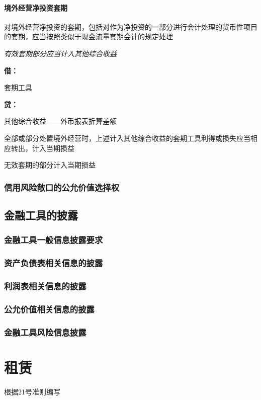 \documentclass[UTF8,12pt]{ctexart}
\newenvironment{Dr}{%
	\begin{list}{}%
		{
			\setlength{\leftmargin}{2em}
			\setlength{\labelwidth}{2em}
			\setlength{\labelsep}{0pt}
			\setlength{\itemindent}{0pt}
			\setlength{\listparindent}{0pt}
			\setlength{\parsep}{0pt}
			\setlength{\topsep}{0pt}
		}
		\item[\textbf{借：}]
	}{%
	\end{list}
}
\newenvironment{Cr}{%
	\begin{list}{}%
		{
			\setlength{\leftmargin}{2em}
			\setlength{\labelwidth}{2em}
			\setlength{\labelsep}{0pt}
			\setlength{\itemindent}{0pt}
			\setlength{\listparindent}{0pt}
			\setlength{\parsep}{0pt}
			\setlength{\topsep}{0pt}
		}
		\item[\textbf{贷：}]
	}{%
	\end{list}
}
\numberwithin{equation}{section} %
\numberwithin{figure}{section}
\numberwithin{table}{section}
\begin{document}
	\paragraph{境外经营净投资套期}
	对境外经营净投资的套期，包括对作为净投资的一部分进行会计处理的货币性项目的套期，应当按照类似于现金流量套期会计的规定处理
	
	\textit{有效套期部分应当计入其他综合收益}
	
	\begin{Dr}
		套期工具
	\end{Dr}
	\begin{Cr}
		其他综合收益——外币报表折算差额
	\end{Cr}
	
	全部或部分处置境外经营时，上述计入其他综合收益的套期工具利得或损失应当相应转出，计入当期损益
	
	无效套期的部分计入当期损益
	
	
	\subsubsection{信用风险敞口的公允价值选择权}

	
	\subsection{金融工具的披露}
	\subsubsection{金融工具一般信息披露要求}
	\subsubsection{资产负债表相关信息的披露}
	\subsubsection{利润表相关信息的披露}
	\subsubsection{公允价值相关信息的披露}
	\subsubsection{金融工具风险信息披露}
	
	\newpage
	\section{租赁}
	根据21号准则编写
\end{document}
